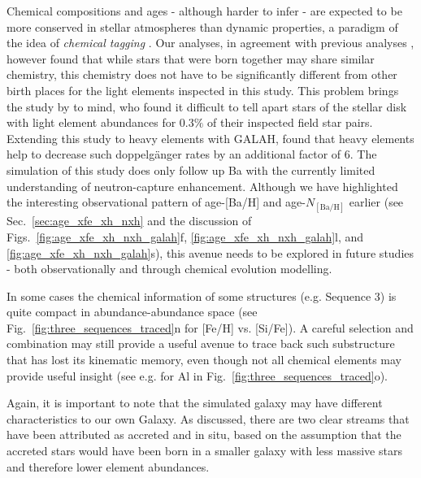 \documentclass[fleqn,usenatbib]{mnras}
\begin{document}
Chemical compositions and ages - although harder to infer - are expected to be more conserved in stellar atmospheres than dynamic properties, a paradigm of the idea of \textit{chemical tagging} \citep{FreemanBlandHawthorn2002}. Our analyses, in agreement with previous analyses \citep[e.g.][]{Khoperskov2023c, Rey2023}, however found that while stars that were born together may share similar chemistry, this chemistry does not have to be significantly different from other birth places for the light elements inspected in this study. This problem brings the study by \citet{Ness2018} to mind, who found it difficult to tell apart stars of the stellar disk with light element abundances for $0.3\%$ of their inspected field star pairs. Extending this study to heavy elements with GALAH, \citep{Manea2023} found that heavy elements help to decrease such doppelgänger rates by an additional factor of 6. The simulation of this study does only follow up Ba with the currently limited understanding of neutron-capture enhancement. Although we have highlighted the interesting observational pattern of age-[Ba/H] and age-$N_\mathrm{[Ba/H]}$ earlier (see Sec.~\ref{sec:age_xfe_xh_nxh} and the discussion of Figs.~\ref{fig:age_xfe_xh_nxh_galah}f, \ref{fig:age_xfe_xh_nxh_galah}l, and \ref{fig:age_xfe_xh_nxh_galah}s), this avenue needs to be explored in future studies - both observationally and through chemical evolution modelling.

In some cases the chemical information of some structures (e.g. Sequence 3) is quite compact in abundance-abundance space (see Fig.~\ref{fig:three_sequences_traced}n for [Fe/H] vs. [Si/Fe]). A careful selection and combination may still provide a useful avenue to trace back such substructure that has lost its kinematic memory, even though not all chemical elements may provide useful insight (see e.g. for Al in Fig.~\ref{fig:three_sequences_traced}o).

Again, it is important to note that the simulated galaxy may have different characteristics to our own Galaxy. As discussed, there are two clear streams that have been attributed as accreted and in situ, based on the assumption that the accreted stars would have been born in a smaller galaxy with less massive stars and therefore lower element abundances.
\end{document}
